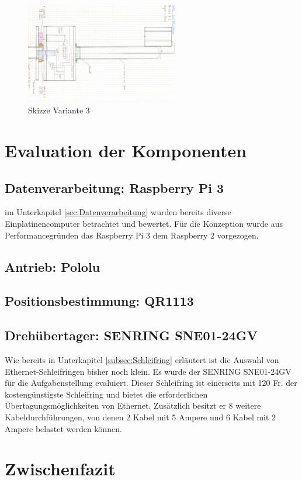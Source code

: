 \begin{figure}[H]
	\centering
	\includegraphics[angle=90,width=0.6\textwidth]{resources/skizze_rotierend.PNG}
	\caption{Skizze Variante 3 }
	\label{fig:skizze_rotierend}
\end{figure} 

\section {Evaluation der Komponenten}
\label{sec:ausgewählteKomponenten}


\subsection{Datenverarbeitung: Raspberry Pi 3}
im Unterkapitel \ref{sec:Datenverarbeitung} wurden bereits diverse Einplatinencomputer betrachtet und bewertet. Für die Konzeption wurde aus Performancegründen das Raspberry Pi 3 dem Raspberry 2 vorgezogen. 

\subsection{Antrieb: Pololu }
\label{subsec:pololu}

\subsection{Positionsbestimmung: QR1113}
\label{subsec:QR1113}



\subsection{Drehübertager: SENRING SNE01-24GV}
\label{subsec:SNE01}
Wie bereits in Unterkapitel \ref{subsec:Schleifring} erläutert ist die Auswahl von Ethernet-Schleifringen bisher noch klein. Es wurde der SENRING SNE01-24GV für die Aufgabenstellung evaluiert. Dieser Schleifring ist einerseits mit 120 Fr. der kostengünstigste Schleifring und bietet die erforderlichen Übertagungsmöglichkeiten von Ethernet. Zusätzlich besitzt er 8 weitere Kabeldurchführungen, von denen 2 Kabel mit 5 Ampere und 6 Kabel mit 2 Ampere belastet werden können. \cite{senring}

\section{Zwischenfazit}
\label{ZwischenfazitKonz}



